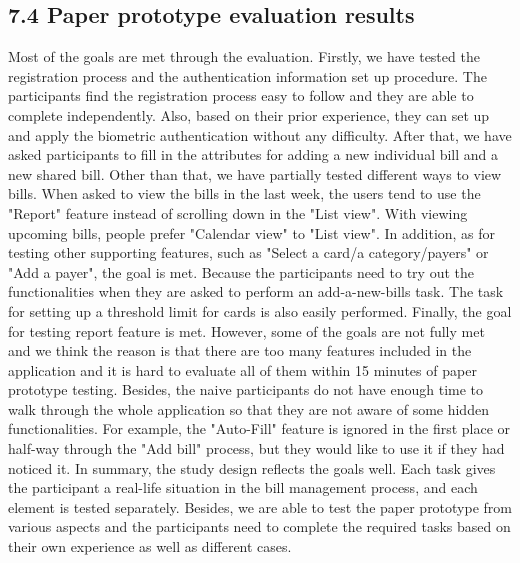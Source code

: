 \documentclass{sigchi}
\begin{document}
\subsection{7.4 Paper prototype evaluation results}

Most of the goals are met through the evaluation. Firstly, we have tested the registration process and the authentication information set up procedure. The participants find the registration process easy to follow and they are able to complete independently. Also, based on their prior experience, they can set up and apply the biometric authentication without any difficulty. After that, we have asked participants to fill in the attributes for adding a new individual bill and a new shared bill. Other than that, we have partially tested different ways to view bills. When asked to view the bills in the last week, the users tend to use the "Report" feature instead of scrolling down in the "List view". With viewing upcoming bills, people prefer "Calendar view" to "List view". In addition, as for testing other supporting features, such as "Select a card/a category/payers" or "Add a payer", the goal is met. Because the participants need to try out the functionalities when they are asked to perform an add-a-new-bills task. The task for setting up a threshold limit for cards is also easily performed. Finally, the goal for testing report feature is met. However, some of the goals are not fully met and we think the reason is that there are too many features included in the application and it is hard to evaluate all of them within 15 minutes of paper prototype testing. Besides, the naive participants do not have enough time to walk through the whole application so that they are not aware of some hidden functionalities. For example, the "Auto-Fill" feature is ignored in the first place or half-way through the "Add bill" process, but they would like to use it if they had noticed it. In summary, the study design reflects the goals well. Each task gives the participant a real-life situation in the bill management process, and each element is tested separately. Besides, we are able to test the paper prototype from various aspects and the participants need to complete the required tasks based on their own experience as well as different cases.
\end{document}
